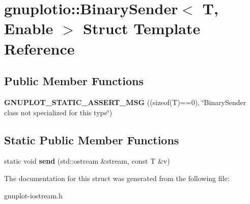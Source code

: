 \hypertarget{structgnuplotio_1_1BinarySender}{}\section{gnuplotio\+:\+:Binary\+Sender$<$ T, Enable $>$ Struct Template Reference}
\label{structgnuplotio_1_1BinarySender}
\subsection*{Public Member Functions}
\begin{DoxyCompactItemize}
\item 
\mbox{\label{structgnuplotio_1_1BinarySender_ad964fa720473ff517cfb461361f645c8}} 
{\bfseries G\+N\+U\+P\+L\+O\+T\+\_\+\+S\+T\+A\+T\+I\+C\+\_\+\+A\+S\+S\+E\+R\+T\+\_\+\+M\+SG} ((sizeof(T)==0), \char`\"{}Binary\+Sender class not specialized for this type\char`\"{})
\end{DoxyCompactItemize}
\subsection*{Static Public Member Functions}
\begin{DoxyCompactItemize}
\item 
\mbox{\label{structgnuplotio_1_1BinarySender_a4b5dd22b7679c4f0ce4d8e75b36c8a21}} 
static void {\bfseries send} (std\+::ostream \&stream, const T \&v)
\end{DoxyCompactItemize}


The documentation for this struct was generated from the following file\+:\begin{DoxyCompactItemize}
\item 
gnuplot-\/iostream.\+h\end{DoxyCompactItemize}
